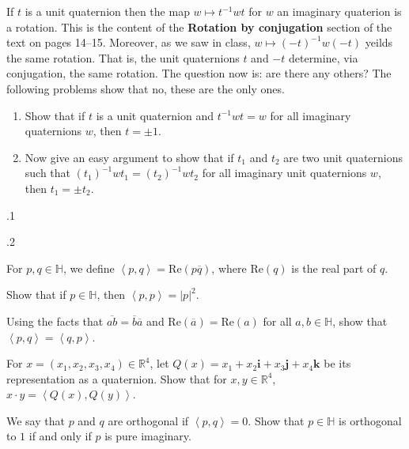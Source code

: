 \documentclass[minion]{homework}
\newcommand{\Reals}{\mathbb{R}}
\def\Quats{\mathbb{H}}
\def\ip<#1,#2>{\left<#1,#2\right>}
\newcommand{\vi}{\mathbf{i}}
\newcommand{\vj}{\mathbf{j}}
\newcommand{\vk}{\mathbf{k}}
\renewcommand{\Re}{\mathrm{Re}}
\begin{document}
\begin{problems}

\problem If $t$ is a unit quaternion then the map $w\mapsto t^{-1}w t$
for $w$ an imaginary quaterion is a rotation.  This is the content of the
\textbf{Rotation by conjugation} section of the text on pages 14--15.
Moreover, as we saw in class, $w\mapsto (-t)^{-1}w(-t)$ yeilds the same
rotation.  That is, the unit quaternions $t$ and $-t$ determine, via 
conjugation, the same rotation.  The question now is: are there any others?  The
following problems show that no, these are the only ones.

\begin{enumerate}
  \item Show that if $t$ is a unit quaternion
and $t^{-1}wt=w$ for all imaginary quaternions $w$, then $t=\pm1$.

  \item Now give an easy argument to show that if $t_1$ and $t_2$ are two unit quaternions such that
$(t_1)^{-1}w t_1 = (t_2)^{-1}w t_2$ for all imaginary unit quaternions $w$,
then $t_1=\pm t_2$.
\end{enumerate}

.1

.2

\problem For $p,q \in \Quats$, we define $\ip<p,q>=\Re(p\overline q)$,
where $\Re(q)$ is the real part of $q$.
\begin{subproblems}
\item Show that if $p\in \Quats$, then $\ip<p,p>=|p|^2$.
\item Using the facts that $\overline{ab}=\overline b \overline a$ and $\Re(\overline a) = \Re(a)$
for all $a,b\in \Quats$, show that $\ip<p,q>=\ip<q,p>$.
\item For $x=(x_1,x_2,x_3,x_4)\in \Reals^4$, let $Q(x)=x_1 + x_2\vi+ x_3\vj+x_4\vk$
be its representation as a quaternion.
Show that for $x,y\in \Reals^4$, $x\cdot y = \ip<Q(x),Q(y)>$.
\item We say that $p$ and $q$ are orthogonal if $\ip<p,q>=0$. 
Show that $p\in\Quats$ is orthogonal to $1$ if and only if $p$ is pure imaginary.
\end{subproblems}


\end{problems}
\end{document}
